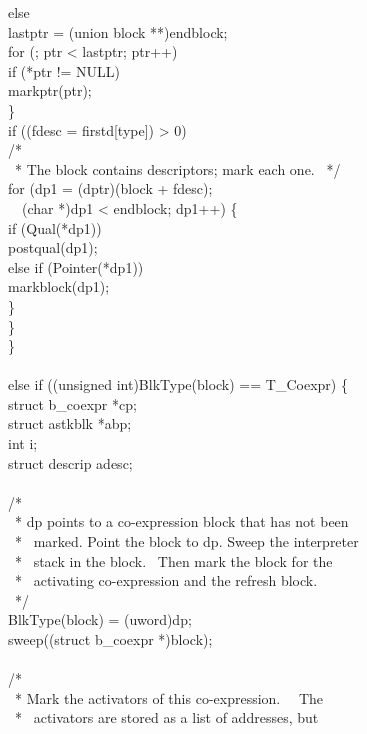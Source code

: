 \begin{iconcode}
\>\>\>\>else\\
\>\>\>\>\>lastptr = (union block **)endblock;\\
\>\>\>\>for (; ptr < lastptr; ptr++)\\
\>\>\>\>\>if (*ptr != NULL)\\
\>\>\>\>\>\>markptr(ptr);\\
\>\>\>\>\}\\
\>\>\>if ((fdesc = firstd[type]) > 0)\\
\>\>\>\>/*\\
\>\>\>\>\ * The block contains descriptors; mark each one. 
\>\>\>\>\ */\\
\>\>\>\>for (dp1 = (dptr)(block + fdesc);\\
\>\>\>\>\>\ \ (char *)dp1 < endblock; dp1++) \{\\
\>\>\>\>\>if (Qual(*dp1))\\
\>\>\>\>\>\>postqual(dp1);\\
\>\>\>\>\>else if (Pointer(*dp1))\\
\>\>\>\>\>\>markblock(dp1);\\
\>\>\>\>\>\}\\
\>\>\>\}\\
\>\>\}\\
\\
\>else if ((unsigned int)BlkType(block) == T\_Coexpr) \{\\
\>\>struct b\_coexpr *cp;\\
\>\>struct astkblk *abp;\\
\>\>int i;\\
\>\>struct descrip adesc;\\
\\
\>\>/*\\
\>\>\ * dp points to a co-expression block that has not been\\
\>\>\ * \ marked. Point the block to dp. Sweep the interpreter\\
\>\>\ * \ stack in the block. \ Then mark the block for the\\
\>\>\ * \ activating co-expression and the refresh block.\\
\>\>\ */\\
\>\>BlkType(block) = (uword)dp;\\
\>\>sweep((struct b\_coexpr *)block);\\
\\
\>\>/*\\
\>\>\ * Mark the activators of this co-expression. \ \ The\\
\>\>\ * \ activators are stored as a list of addresses, but\\

\end{iconcode}
